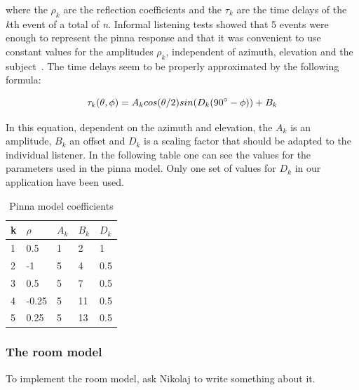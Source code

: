 \documentclass[journal]{IEEEtran}
\begin{document}
where the $\rho_{k}$ are the reflection coefficients and the $\tau_{k}$ are the time delays of the \textit{k}th event of a total of \textit{n}. Informal listening tests showed that 5 events were enough to represent the pinna response and that it was convenient to use constant values for the amplitudes $\rho_{k}$,  independent of azimuth, elevation and the subject~\cite{Brown1997}. The time delays seem to be properly approximated by the following formula:

\begin{equation}\label{eq:pinna}
\tau_{k}(\theta,\phi) = A_{k}cos(\theta/2)sin(D_{k}(90\degree-\phi)) + B_{k}
\end{equation} 

In this equation, dependent on the azimuth and elevation, the $A_{k}$ is an amplitude, $B_{k}$ an offset and $D_{k}$ is a scaling factor that should be adapted to the individual listener. 
In the following table one can see the values for the parameters used in the pinna model. Only one set of values for $D_{k}$ in our application have been used.

\begin{table}[h]
\centering
\caption{Pinna model coefficients}
\label{PinnaModel parameters}
\begin{tabular}{|l|l|l|l|l|}
\hline
k & $\rho$  & $A_{k}$ & $B_{k}$  & $D_{k}$   \\ \hline
1 & 0.5   & 1 & 2  & 1   \\ \hline
2 & -1    & 5 & 4  & 0.5 \\ \hline
3 & 0.5   & 5 & 7  & 0.5 \\ \hline
4 & -0.25 & 5 & 11 & 0.5 \\ \hline
5 & 0.25  & 5 & 13 & 0.5 \\ \hline
\end{tabular}
\end{table}



\subsubsection{The room model}
To implement the room model, ask Nikolaj to write something about it.


\end{document}
